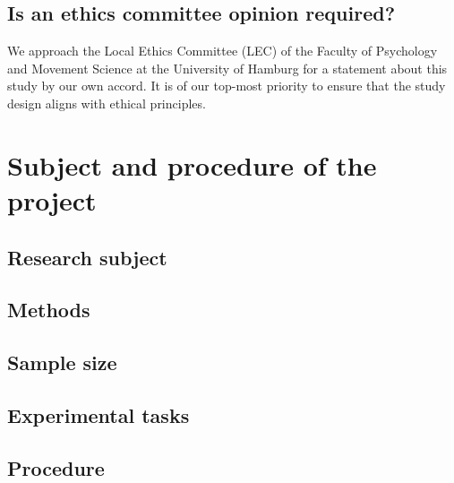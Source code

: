\documentclass[11pt,twoside,a4paper]{article}
\begin{document}
\subsection{Is an ethics committee opinion required?}

We approach the Local Ethics Committee (LEC) of the Faculty of Psychology and Movement Science at the University of Hamburg for a statement about this study by our own accord.
It is of our top-most priority to ensure that the study design aligns with ethical principles.

\section{Subject and procedure of the project}

\subsection{Research subject}



\subsection{Methods}

\subsection{Sample size}


\subsection{Experimental tasks}


\subsection{Procedure}

\end{document}
